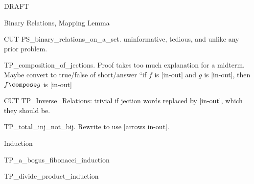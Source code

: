 \documentclass[quiz]{mcs}
\begin{document}


\examspace

\begin{center}
{\Large DRAFT}
\end{center}

\begin{center}
{\large Binary Relations, Mapping Lemma}
\end{center}

\begin{staffnotes}
CUT PS\_binary\_relations\_on\_a\_set.  uninformative, tedious, and unlike any prior problem.
\end{staffnotes}

\begin{staffnotes}
TP\_composition\_of\_jections. Proof takes too much explanation for a
midterm.  Maybe convert to true/false of short/answer ``if $f$ is
[in-out] and $g$ is [in-out], then $f \compose g$ is [in-out]
\end{staffnotes}


\begin{staffnotes}
CUT TP\_Inverse\_Relations: trivial if jection words replaced by
[in-out], which they should be.
\end{staffnotes}

\begin{staffnotes}
TP\_total\_inj\_not\_bij.  Rewrite to use [arrows in-out].
\end{staffnotes}

\begin{center}
{\large Induction}
\end{center}
\begin{staffnotes}
TP\_a\_bogus\_fibonacci\_induction
\end{staffnotes}

\begin{staffnotes}
TP\_divide\_product\_induction
\end{staffnotes}
\end{document}

